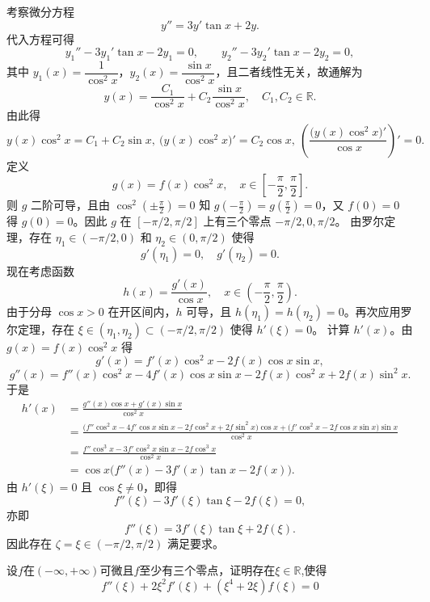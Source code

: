 \begin{solution}
考察微分方程
\[
y'' = 3y'\tan x + 2y. \tag{1}
\]
代入方程可得
\[
y_1''-3y_1'\tan x-2y_1=0,\qquad
y_2''-3y_2'\tan x-2y_2=0,
\]
其中 $y_1(x)=\dfrac{1}{\cos^2 x}$，$y_2(x)=\dfrac{\sin x}{\cos^2 x}$，且二者线性无关，故通解为
\[
y(x) = \frac{C_1}{\cos^2 x} + C_2\frac{\sin x}{\cos^2 x},\quad C_1,C_2\in\mathbb{R}.
\]
由此得
\[
y(x)\cos^2 x = C_1 + C_2\sin x,~\bigl(y(x)\cos^2 x\bigr)' = C_2\cos x,~\left(\frac{\bigl(y(x)\cos^2 x\bigr)'}{\cos x}\right)' = 0. \tag{2}
\]
定义
\[
g(x) = f(x)\cos^2 x,\quad x\in\left[-\frac{\pi}{2},\frac{\pi}{2}\right].
\]
则 $g$ 二阶可导，且由 $\cos^2\!\left(\pm\frac{\pi}{2}\right)=0$ 知 $g\!\left(-\frac{\pi}{2}\right)=g\!\left(\frac{\pi}{2}\right)=0$，又 $f(0)=0$ 得 $g(0)=0$。因此 $g$ 在 $[-\pi/2,\pi/2]$ 上有三个零点 $-\pi/2,0,\pi/2$。
由罗尔定理，存在 $\eta_1\in(-\pi/2,0)$ 和 $\eta_2\in(0,\pi/2)$ 使得
\[
g'(\eta_1)=0,\quad g'(\eta_2)=0.
\]
现在考虑函数
\[
h(x)=\frac{g'(x)}{\cos x},\quad x\in\left(-\frac{\pi}{2},\frac{\pi}{2}\right).
\]
由于分母 $\cos x>0$ 在开区间内，$h$ 可导，且 $h(\eta_1)=h(\eta_2)=0$。再次应用罗尔定理，存在 $\xi\in(\eta_1,\eta_2)\subset(-\pi/2,\pi/2)$ 使得 $h'(\xi)=0$。
计算 $h'(x)$。由 $g(x)=f(x)\cos^2 x$ 得
\[
g'(x)=f'(x)\cos^2 x-2f(x)\cos x\sin x,
\]
\[
g''(x)=f''(x)\cos^2 x-4f'(x)\cos x\sin x-2f(x)\cos^2 x+2f(x)\sin^2 x.
\]
于是
\begin{align*}
h'(x)&=\frac{g''(x)\cos x+g'(x)\sin x}{\cos^2 x}\\
&=\frac{\bigl(f''\cos^2 x-4f'\cos x\sin x-2f\cos^2 x+2f\sin^2 x\bigr)\cos x+\bigl(f'\cos^2 x-2f\cos x\sin x\bigr)\sin x}{\cos^2 x}\\
&=\frac{f''\cos^3 x-3f'\cos^2 x\sin x-2f\cos^3 x}{\cos^2 x}\\
&=\cos x\bigl(f''(x)-3f'(x)\tan x-2f(x)\bigr).
\end{align*}
由 $h'(\xi)=0$ 且 $\cos\xi\neq0$，即得
\[
f''(\xi)-3f'(\xi)\tan\xi-2f(\xi)=0,
\]
亦即
\[
f''(\xi)=3f'(\xi)\tan\xi+2f(\xi).
\]
因此存在 $\zeta=\xi\in(-\pi/2,\pi/2)$ 满足要求。
\end{solution}
\begin{example}[$f''\left(\xi\right)+2\xi^2f'\left(\xi\right)+\left(\xi^4+2\xi\right)f\left(\xi\right)=0$]
    设$f$在$(-\infty,+\infty)$可微且$f$至少有三个零点，证明存在$\xi\in\mathbb{R}$,使得
$$f''\left(\xi\right)+2\xi^2f'\left(\xi\right)+\left(\xi^4+2\xi\right)f\left(\xi\right)=0$$
\end{example}
